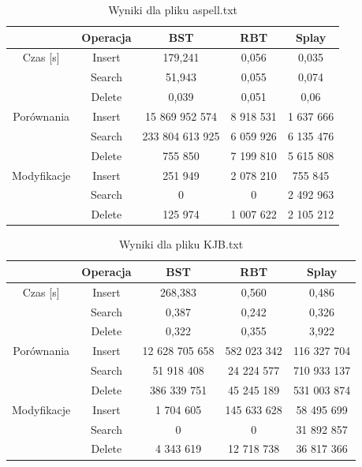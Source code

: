 \documentclass[10pt,a4paper]{article}
\theoremstyle{definition}
\theoremstyle{definition}
\theoremstyle{definition}
\begin{document}
            \begin{table}[h]
            \centering
            \caption{Wyniki dla pliku aspell.txt}
            \label{tab:aspell}
            \begin{tabular}{|c|c|c|c|c|} \hline
            		 & Operacja & BST & RBT & Splay \\
            		\hline
            		Czas [s] & Insert & 179,241 & 0,056 & 0,035 \\
            		
            		& Search & 51,943 & 0,055 & 0,074 \\
            	
            		& Delete & 0,039 & 0,051 & 0,06 \\
            		\hline
            		Porównania & Insert & 15 869 952 574 & 8 918 531 & 1 637 666 \\
            		& Search & 233 804 613 925 & 6 059 926 & 6 135 476 \\
            		& Delete & 755 850 & 7 199 810 & 5 615 808 \\
            		\hline
            		Modyfikacje & Insert & 251 949 & 2 078 210 & 755 845 \\
            		& Search & 0 & 0 & 2 492 963 \\
            		& Delete & 125 974 & 1 007 622 & 2 105 212 \\
            		\hline 
            \end{tabular}
            \end{table}
            
            \begin{table}[h]
            \centering
            \caption{Wyniki dla pliku KJB.txt}
            \label{tab:kjb}
            \begin{tabular}{|c|c|c|c|c|} \hline
            		 & Operacja & BST & RBT & Splay \\
            		\hline
            		Czas [s] & Insert & 268,383 & 0,560 & 0,486 \\
            		
            		& Search & 0,387 & 0,242 & 0,326 \\
            	
            		& Delete & 0,322 & 0,355 & 3,922 \\
            		\hline
            		Porównania & Insert & 12 628 705 658 & 582 023 342 & 116 327 704 \\
            		& Search & 51 918 408 & 24 224 577 & 710 933 137 \\
            		& Delete & 386 339 751 & 45 245 189 & 531 003 874 \\
            		\hline
            		Modyfikacje & Insert & 1 704 605 & 145 633 628 & 58 495 699 \\
            		& Search & 0 & 0 & 31 892 857 \\
            		& Delete & 4 343 619 & 12 718 738 & 36 817 366 \\
            		\hline 
            \end{tabular}
            \end{table}
            
\end{document}
